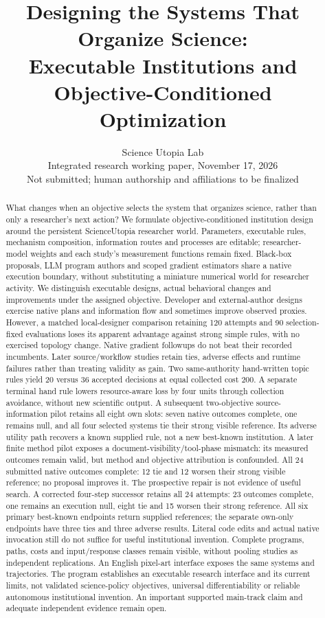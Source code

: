 \documentclass{article}
\title{Designing the Systems That Organize Science:\\
Executable Institutions and\\Objective-Conditioned Optimization}
\author{Science Utopia Lab\\Integrated research working paper, November 17, 2026\\
Not submitted; human authorship and affiliations to be finalized}
\begin{document}
\maketitle
\begin{abstract}
What changes when an objective selects the system that organizes science,
rather than only a researcher's next action? We formulate objective-conditioned
institution design around the persistent ScienceUtopia researcher world.
Parameters, executable rules, mechanism composition, information routes and
processes are editable; researcher-model weights and each study's measurement
functions remain fixed. Black-box proposals, LLM program authors and scoped
gradient estimators share a native execution boundary, without substituting
a miniature numerical world for researcher activity.
We distinguish executable designs, actual behavioral changes and improvements
under the assigned objective. Developer and external-author designs exercise
native plans and information flow and sometimes improve observed proxies.
However, a matched local-designer comparison retaining 120 attempts and 90
selection-fixed evaluations loses its apparent advantage against strong simple
rules, with no exercised topology change. Native gradient followups do not
beat their recorded incumbents. Later source/workflow studies retain ties,
adverse effects and runtime failures rather than treating validity as gain.
Two same-authority hand-written topic rules yield 20 versus 36 accepted
decisions at equal collected cost 200. A separate terminal hand rule lowers
resource-aware loss by four units through collection avoidance, without new
scientific output. A subsequent two-objective source-information pilot retains
all eight own slots: seven native outcomes complete, one remains null, and all
four selected systems tie their strong visible reference. Its adverse utility
path recovers a known supplied rule, not a new best-known institution.
A later finite method pilot exposes a document-visibility/tool-phase mismatch:
its measured outcomes remain valid, but method and objective attribution is
confounded. All 24 submitted native outcomes complete: 12 tie and 12 worsen
their strong visible reference; no proposal improves it. The prospective
repair is not evidence of useful search. A corrected four-step successor retains
all 24 attempts: 23 outcomes complete, one remains an execution null, eight tie
and 15 worsen their strong reference. All six primary best-known endpoints
return supplied references; the separate own-only endpoints have three ties
and three adverse results. Literal code edits and actual native invocation
still do not suffice for useful institutional invention.
Complete programs, paths, costs and input/response classes remain visible,
without pooling studies as independent replications. An English pixel-art
interface exposes the same systems and trajectories. The program establishes
an executable research interface and its current limits, not validated
science-policy objectives, universal differentiability or reliable autonomous
institutional invention. An important supported main-track claim and adequate
independent evidence remain open.
\end{abstract}
\end{document}
